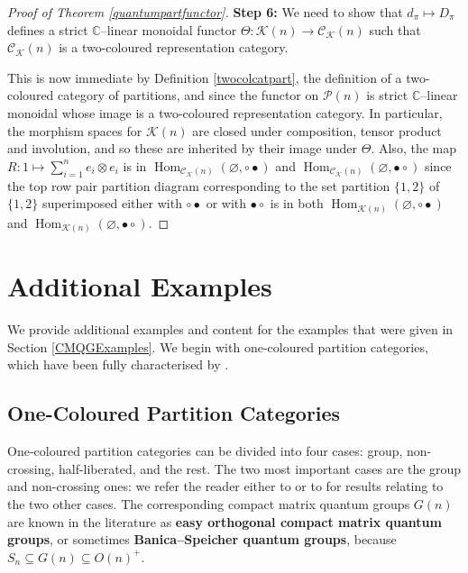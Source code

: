 \documentclass{article}
\DeclareMathOperator{\Hom}{Hom}
\theoremstyle{plain}
\theoremstyle{definition}
\theoremstyle{remark}
\begin{document}
\begin{proof}[Proof of Theorem \ref{quantumpartfunctor}]
	\textbf{Step 6:} We need to show that $d_\pi \mapsto D_\pi$ defines a 
	strict $\mathbb{C}$--linear monoidal functor
	$\Theta : \mathcal{K}(n) \rightarrow \mathcal{C}_{\mathcal{K}}(n)$
	such that $\mathcal{C}_{\mathcal{K}}(n)$ is a 
	two-coloured representation category.

	This is now immediate by Definition \ref{twocolcatpart}, 
	the definition of a two-coloured category of partitions, 
	and since the functor on $\mathcal{P}(n)$ 
	is strict $\mathbb{C}$--linear monoidal
	whose image is a two-coloured representation category.
	In particular, the morphism spaces for $\mathcal{K}(n)$ are closed under
	composition, tensor product and involution, and so these are inherited
	by their image under $\Theta$.
	Also, the map $R : 1 \mapsto \sum_{i=1}^{n} e_i \otimes e_i$ is in 
	$\Hom_{\mathcal{C}_{\mathcal{K}}(n)}(\varnothing, \circ\bullet)$ 
	and
	$\Hom_{\mathcal{C}_{\mathcal{K}}(n)}(\varnothing, \bullet\circ)$
	since the top row pair partition diagram corresponding to the set partition
	$\{1,2\}$ of $\{1,2\}$ superimposed either with $\circ\bullet$ or with
	$\bullet\circ$ is in both
	$\Hom_{\mathcal{K}(n)}(\varnothing, \circ\bullet)$ 
	and
	$\Hom_{\mathcal{K}(n)}(\varnothing, \bullet\circ)$.
\end{proof}



\section{Additional Examples} \label{addexamples}

We provide additional examples and content for the examples that were given in
Section \ref{CMQGExamples}.
We begin with one-coloured partition categories, which have been fully characterised
by \citet{raum2016}.

\subsection{One-Coloured Partition Categories}

One-coloured partition categories can be divided into four cases: 
group, non-crossing, half-liberated, and the rest. 
The two most important cases are the group and non-crossing ones: we refer the reader 
either to \citet{banica2010} or to \citet{gromada2020}
for results relating to the two other cases.
The corresponding compact matrix quantum groups $G(n)$ are known in the literature as 
\textbf{easy orthogonal compact matrix quantum groups}, 
or sometimes \textbf{Banica--Speicher quantum groups}, 
because $S_n \subseteq G(n) \subseteq O(n)^{+}$. 
\end{document}
